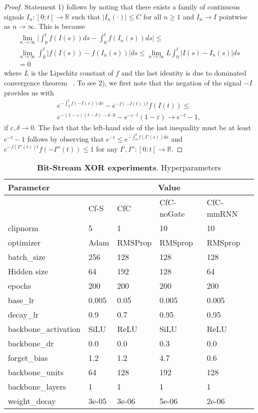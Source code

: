 \documentclass[12pt]{article}
\newcommand{\RE}{\mathbb{R}}
\begin{document}
\begin{proof}
Statement 1) follows by noting that there exists a family of continuous signals $I_n : [0;t] \to \RE$ such that $|I_n(\cdot)| \leq C$ for all $n \geq 1$ and $I_n \to I$ pointwise as $n \to \infty$. This is because
\begin{align*}
\lim_{n \to \infty} \Big| \int_0^t f(I(s)) ds -  \int_0^t f(I_n(s)) ds \Big| \leq \\ \lim_{n \to \infty} \int_0^t |f(I(s)) - f(I_n(s))| ds \leq \lim_{n \to \infty} L \int_0^t |I(s) - I_n(s)| ds \\
= 0
\end{align*}
where $L$ is the Lipschitz constant of $f$ and the last identity is due to dominated convergence theorem~ \cite{Rudin76}. To see 2), we first note that the negation of the signal $-I$ provides us with
\begin{align*}
e^{-\int_0^t f(-I(s)) ds } - e^{-f(-I(t)) t} f(I(t)) \leq \\ e^{- (1 - \varepsilon) (t - \delta) - \delta \cdot 0 } - e^{- \varepsilon \cdot t} (1 - \varepsilon) \to e^{-t} - 1 ,
\end{align*}
if $\varepsilon, \delta \to 0$. The fact that the left-hand side of the last inequality must be at least $e^{-t} - 1$ follows by observing that $e^{-t} \leq e^{-\int_0^t f(I'(s)) ds } $ and $e^{-f(I''(t)) t} f(-I''(t)) \leq 1$ for any $I',I'' : [0;t] \to \RE$.
\end{proof}

\clearpage

\begin{table}[t]
    \centering
    \caption{\textbf{Bit-Stream XOR experiments}. Hyperparameters}
\begin{tabular}{lllll}
\toprule
Parameter & \multicolumn{4}{c}{Value}  \\
\midrule
{} & Cf-S & CfC & CfC-noGate & CfC-mmRNN \\
\midrule
clipnorm & 5 & 1 & 10 & 10 \\ 
optimizer & Adam & RMSProp & RMSprop & RMSprop \\
batch\_size & 256 & 128 & 128 & 128\\
Hidden size & 64 & 192 & 128 & 64 \\
epochs      & 200 & 200 & 200 & 200 \\ 
   base\_lr & 0.005 & 0.05 & 0.005 & 0.005\\
   decay\_lr & 0.9 & 0.7 & 0.95 & 0.95 \\ 
   backbone\_activation & SiLU & ReLU & SiLU & ReLU \\ 
   backbone\_dr & 0.0 & 0.0 & 0.3 & 0.0 \\
   forget\_bias & 1.2 & 1.2 & 4.7 & 0.6 \\
   backbone\_units & 64 & 128 & 192 & 128 \\
   backbone\_layers & 1 & 1 & 1 & 1 \\
   weight\_decay & 3e-05 & 3e-06 & 5e-06 & 2e-06 \\ 
\bottomrule
\end{tabular}
    \label{tab:hyperparamsxor}
\end{table}
\end{document}
